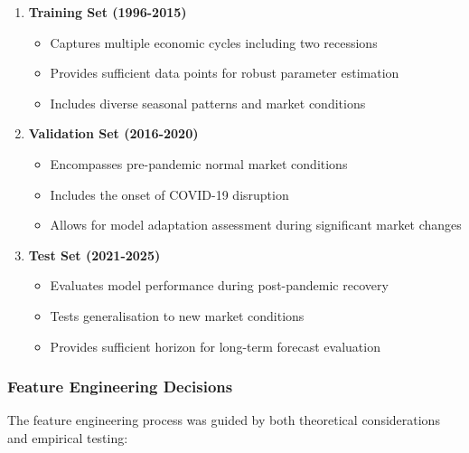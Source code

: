 \documentclass[12pt,a4paper]{report}
\begin{document}
\begin{enumerate}
    \item \textbf{Training Set (1996-2015)}
    \begin{itemize}
        \item Captures multiple economic cycles including two recessions
        \item Provides sufficient data points for robust parameter estimation
        \item Includes diverse seasonal patterns and market conditions
    \end{itemize}

    \item \textbf{Validation Set (2016-2020)}
    \begin{itemize}
        \item Encompasses pre-pandemic normal market conditions
        \item Includes the onset of COVID-19 disruption
        \item Allows for model adaptation assessment during significant market changes
    \end{itemize}

    \item \textbf{Test Set (2021-2025)}
    \begin{itemize}
        \item Evaluates model performance during post-pandemic recovery
        \item Tests generalisation to new market conditions
        \item Provides sufficient horizon for long-term forecast evaluation
    \end{itemize}
\end{enumerate}

\subsubsection{Feature Engineering Decisions}
The feature engineering process was guided by both theoretical considerations and empirical testing:
\end{document}

